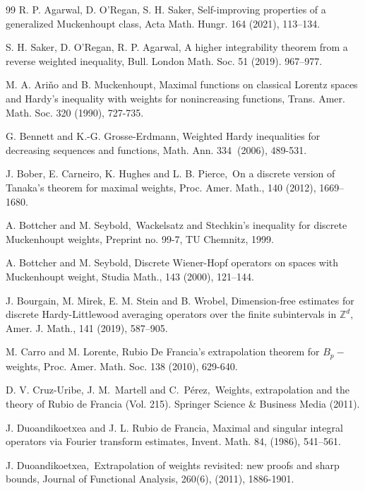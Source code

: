 \documentclass[a4paper]{amsart}
\theoremstyle{plain}
\numberwithin{equation}{section}
\begin{document}
\begin{thebibliography}{99}
 R. P. Agarwal, D. O'Regan, S. H. Saker, Self-improving
properties of a generalized Muckenhoupt class, Acta Math. Hungr. 164 (2021),
113--134.

 S. H. Saker, D. O'Regan, R. P. Agarwal, A higher
integrability theorem from a reverse weighted inequality, Bull. London Math.
Soc. 51 (2019). 967--977.

 M. A. Ari\v{n}o and B. Muckenhoupt, Maximal functions on
classical Lorentz spaces and Hardy's inequality with weights for
nonincreasing functions, Trans. Amer. Math. Soc. 320 (1990), 727-735.

 G. Bennett and K.-G. Grosse-Erdmann, Weighted Hardy
inequalities for decreasing sequences and functions, Math. Ann. 334\textbf{\ 
}(2006), 489-531.

 J. Bober, E. Carneiro, K. Hughes and L. B. Pierce,\ On a
discrete version of Tanaka's theorem for maximal weights, Proc. Amer. Math.,
140 (2012), 1669--1680.

 A. Bottcher and M. Seybold,\ Wackelsatz and Stechkin's
inequality for discrete Muckenhoupt weights, Preprint no. 99-7, TU Chemnitz,
1999.

 A. Bottcher and M. Seybold, Discrete Wiener-Hopf operators on
spaces with Muckenhoupt weight, Studia Math., 143 (2000), 121--144.

 J. Bourgain, M. Mirek, E. M. Stein and B. Wrobel, Dimension-free
estimates for discrete Hardy-Littlewood averaging operators over the finite
subintervals in $\mathbb{Z}^{d},$ Amer. J. Math., 141 (2019), 587--905.

 M. Carro and M. Lorente, Rubio De Francia's extrapolation
theorem for $B_{p}-$weights, Proc. Amer. Math. Soc. 138 (2010), 629-640.

 D. V. Cruz-Uribe, J. M.\ Martell and C.\ P\'{e}rez,\
Weights, extrapolation and the theory of Rubio de Francia (Vol. 215).
Springer Science \& Business Media (2011).

 J. Duoandikoetxea and J. L. Rubio de Francia, Maximal and
singular integral operators via Fourier transform estimates, Invent. Math.
84, (1986), 541--561.

 J. Duoandikoetxea,\ Extrapolation of weights revisited: new
proofs and sharp bounds, Journal of Functional Analysis, 260(6), (2011),
1886-1901.


\end{thebibliography}
\end{document}
